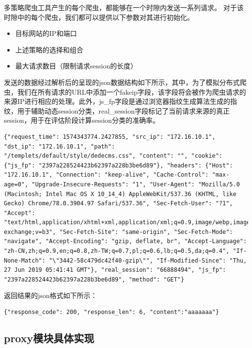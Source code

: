 \documentclass[doctor,privacy,twoside]{buaa_mac}
\begin{document}
多策略爬虫工具产生的每个爬虫，都能够在一个时隙内发送一系列请求。 对于该时隙中的每个爬虫，我们都可以提供以下参数对其进行初始化。

\begin{itemize}
\item 目标网站的IP和端口
\item 上述策略的选择和组合
\item 最大请求数目（限制请求session的长度）
\end {itemize}

发送的数据经过解析后的呈现的json数据结构如下所示，其中，为了模拟分布式爬虫，我们在所有请求的URL中添加一个fakeip字段，该字段将会被作为爬虫请求的来源IP进行相应的处理。此外，js\_{}fp字段是通过浏览器指纹生成算法生成的指纹，用于辅助动态session分类，real\_{}session字段标记了当前请求来源的真正session，用于在评估阶段计算session分类的准确率。
\centerline{}
\lstset{language=JavaScript}
\begin{lstlisting}
{"request_time": 1574343774.2427855, "src_ip": "172.16.10.1", "dst_ip": "172.16.10.1", "path": "/templets/default/style/dedecms.css", "content": "", "cookie": {"js_fp": "2397a228524423b62397a228b3be6d89"}, "headers": {"Host": "172.16.10.1", "Connection": "keep-alive", "Cache-Control": "max-age=0", "Upgrade-Insecure-Requests": "1", "User-Agent": "Mozilla/5.0 (Macintosh; Intel Mac OS X 10_14_4) AppleWebKit/537.36 (KHTML, like Gecko) Chrome/78.0.3904.97 Safari/537.36", "Sec-Fetch-User": "?1", "Accept": "text/html,application/xhtml+xml,application/xml;q=0.9,image/webp,image/apng,*/*;q=0.8,application/signed-exchange;v=b3", "Sec-Fetch-Site": "same-origin", "Sec-Fetch-Mode": "navigate", "Accept-Encoding": "gzip, deflate, br", "Accept-Language": "zh-CN,zh;q=0.9,en;q=0.8,zh-TW;q=0.7,pl;q=0.6,lb;q=0.5,da;q=0.4", "If-None-Match": "\"3442-58c479dc42f40-gzip\"", "If-Modified-Since": "Thu, 27 Jun 2019 05:41:41 GMT"}, "real_session": "66888494", "js_fp": "2397a228524423b62397a228b3be6d89", "method": "GET"}
\end{lstlisting}

返回结果的json格式如下所示：
\lstset{language=JavaScript}
\begin{lstlisting}
{"response_code": 200, "response_len": 6, "content":"aaaaaaa"}
\end{lstlisting}




\subsection{proxy模块具体实现}
\end{document}
